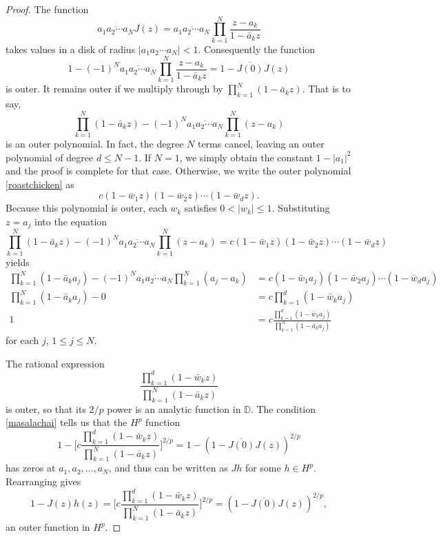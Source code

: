 \documentclass[10pt,a4paper]{amsart}
\renewcommand{\leq}{\leqslant}
\begin{document}
\begin{proof}
The function
\[
      \overline{ a_1 a_2 \cdots a_N}J(z) = \overline{ a_1 a_2 \cdots a_N} \prod_{k=1}^{N}\frac{z - a_k}{1-\bar{a}_k z}
\]
takes values in a disk of radius $|a_1 a_2 \cdots a_N|<1$.  Consequently the function
\begin{equation*}%
      1 -  (-1)^N\overline{ a_1 a_2 \cdots a_N} \prod_{k=1}^{N}\frac{z - a_k}{1-\bar{a}_k z}  = 1 - \overline{J(0)}J(z)
\end{equation*}
is outer.  It remains outer if we multiply through by $\prod_{k=1}^{N}(1 - \bar{a}_k z)$.  That is to say,
\begin{equation}\label{roastchicken}
     \prod_{k=1}^{N}(1 - \bar{a}_k z) - (-1)^N \overline{ a_1 a_2 \cdots a_N} \prod_{k=1}^{N}(z - a_k)
\end{equation}
is an outer polynomial.  In fact, the degree $N$ terms cancel, leaving an outer polynomial of degree $d\leq N-1$. If $N = 1$, we simply obtain the constant $1 - |a_1|^2$ and the proof is complete for that case. Otherwise,  we write  the outer polynomial \eqref{roastchicken} as
\begin{equation}\label{outerpoly}
      c(1 - \bar{w}_1 z)(1 - \bar{w}_2 z)\cdots(1 - \bar{w}_{d}z).
\end{equation}
Because this polynomial is outer, each $w_k$ satisfies $0<|w_k| \leq 1$.   Substituting $z = a_j$ into the equation
\[
     \prod_{k=1}^{N}(1 - \bar{a}_k z) - (-1)^N \overline{ a_1 a_2 \cdots a_N} \prod_{k=1}^{N}(z - a_k) = c(1 - \bar{w}_1 z)(1 - \bar{w}_2 z)\cdots(1 - \bar{w}_{d}z)
\]
yields
\begin{align}
      \prod_{k=1}^{N}(1 - \bar{a}_k a_j) - (-1)^N \overline{ a_1 a_2 \cdots a_N} \prod_{k=1}^{N}(a_j - a_k) &= c(1 - \bar{w}_1 a_j)(1 - \bar{w}_2 a_j)\cdots(1 - \bar{w}_{d}a_j) \nonumber \\
       \prod_{k=1}^{N}(1 - \bar{a}_k a_j) -0  &= c \prod_{k=1}^{d}(1 - \bar{w}_k a_j) \nonumber \\
       1 &= c\frac{\prod_{k=1}^{d}(1 - \bar{w}_k a_j)}{\prod_{k=1}^{N}(1 - \bar{a}_k a_j)}  \label{masalachai}
\end{align} for each $j$, $1\leq j\leq N$.

The rational expression 
\[
    \frac{\prod_{k=1}^{d}(1 - \bar{w}_k z)}{\prod_{k=1}^{N}(1 - \bar{a}_k z)}
\]
is outer, so that its $2/p$ power is an analytic function in $\mathbb{D}$.  
The condition \eqref{masalachai} tells us that the $H^p$ function
\begin{equation*}%
    1 - \Bigg[c\frac{\prod_{k=1}^{d}(1 - \bar{w}_k z)}{\prod_{k=1}^{N}(1 - \bar{a}_k z)}\Bigg]^{2/p}  = 1 - \left( 1 - \overline{J(0)} J(z) \right)^{2/p}
\end{equation*}
has zeros at $a_1, a_2,\ldots, a_N$, and thus can be written as $Jh$ for some $h \in H^p$.
  Rearranging gives
\begin{equation}\label{Jhat3}
     1 - J(z)h(z) = \Bigg[c\frac{\prod_{k=1}^{d}(1 - \bar{w}_k z)}{\prod_{k=1}^{N}(1 - \bar{a}_k z)}\Bigg]^{2/p} = \left( 1 - \overline{J(0)} J(z) \right)^{2/p},
\end{equation}
an outer function in $H^p$.


\end{proof}
\end{document}
